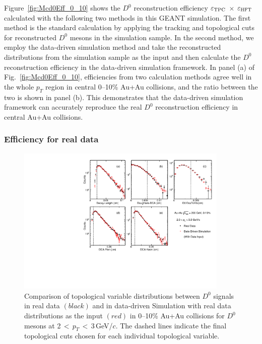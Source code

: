 \documentclass[%
 reprint,	
 amsmath,amssymb,
 aps,
 prc,
]{revtex4-1}
\begin{document}
Figure~\ref{fig:Mcd0Eff_0_10} shows the $D^0$ reconstruction efficiency $\varepsilon_{\rm TPC}$ $\times$ $\varepsilon_{\rm HFT}$ calculated with the following two methods in this GEANT simulation. The first method is the standard calculation by applying the tracking and topological cuts for reconstructed $D^0$ mesons in the simulation sample. In the second method, we employ the data-driven simulation method and take the reconstructed distributions from the simulation sample as the input and then calculate the $D^0$ reconstruction efficiency in the data-driven simulation framework. In panel (a) of Fig.~\ref{fig:Mcd0Eff_0_10}, efficiencies from two calculation methods agree well in the whole $p_{T}$ region in central 0--10\% Au+Au collisions, and the ratio between the two is shown in panel (b). This demonstrates that the data-driven simulation framework can accurately reproduce the real $D^0$ reconstruction efficiency in central Au+Au collisions.


\subsubsection{Efficiency for real data}
\label{correction:hft:fordata}

\begin{figure}
\centering
\includegraphics[width=0.9\textwidth]{fig/DataTopo.pdf}
\caption{Comparison of topological variable distributions between $D^0$ signals in real data $(black)$ and in data-driven Simulation with real data distributions as the input $(red)$ in 0--10\% Au+Au collisions for $D^0$ mesons at 2\,$<$\,$p_T$\,$<$\,3\,GeV/$c$. The dashed lines indicate the final topological cuts chosen for each individual topological variable.}
\label{fig:DataTopo} 
\end{figure}
\end{document}
